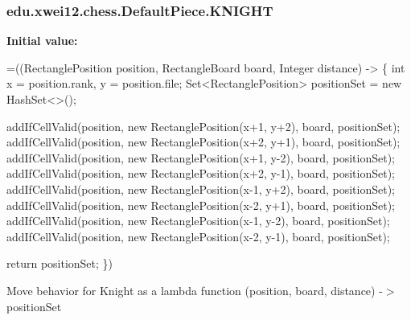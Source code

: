 \subsubsection[{\texorpdfstring{K\+N\+I\+G\+HT}{KNIGHT}}]{\setlength{\rightskip}{0pt plus 5cm}edu.\+xwei12.\+chess.\+Default\+Piece.\+K\+N\+I\+G\+HT}\hypertarget{enumedu_1_1xwei12_1_1chess_1_1_default_piece_abd7f561f396be3df6d124b91f3183b1d}{}\label{enumedu_1_1xwei12_1_1chess_1_1_default_piece_abd7f561f396be3df6d124b91f3183b1d}
{\bfseries Initial value\+:}
\begin{DoxyCode}
=((RectanglePosition position, RectangleBoard board, Integer distance) -> \{
        \textcolor{keywordtype}{int} x = position.rank, y = position.file;
        Set<RectanglePosition> positionSet = \textcolor{keyword}{new} HashSet<>();

        
        addIfCellValid(position, \textcolor{keyword}{new} RectanglePosition(x+1, y+2), board, positionSet);
        addIfCellValid(position, \textcolor{keyword}{new} RectanglePosition(x+2, y+1), board, positionSet);
        addIfCellValid(position, \textcolor{keyword}{new} RectanglePosition(x+1, y-2), board, positionSet);
        addIfCellValid(position, \textcolor{keyword}{new} RectanglePosition(x+2, y-1), board, positionSet);
        addIfCellValid(position, \textcolor{keyword}{new} RectanglePosition(x-1, y+2), board, positionSet);
        addIfCellValid(position, \textcolor{keyword}{new} RectanglePosition(x-2, y+1), board, positionSet);
        addIfCellValid(position, \textcolor{keyword}{new} RectanglePosition(x-1, y-2), board, positionSet);
        addIfCellValid(position, \textcolor{keyword}{new} RectanglePosition(x-2, y-1), board, positionSet);

        \textcolor{keywordflow}{return} positionSet;
    \})
\end{DoxyCode}
Move behavior for Knight as a lambda function (position, board, distance) -\/$>$ position\+Set 
